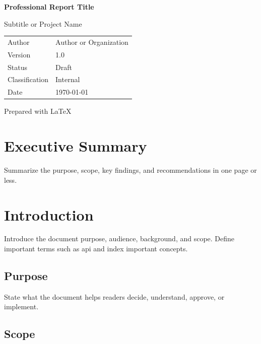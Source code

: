 \documentclass[11pt,a4paper,oneside]{scrreprt}
\newcommand{\DocumentTitle}{Professional Report Title}
\newcommand{\DocumentSubtitle}{Subtitle or Project Name}
\newcommand{\DocumentAuthor}{Author or Organization}
\newcommand{\DocumentVersion}{1.0}
\newcommand{\DocumentStatus}{Draft}
\newcommand{\DocumentDate}{\today}
\newcommand{\DocumentClassification}{Internal}
\begin{document}
\begin{titlepage}
  \centering
  \vspace*{18mm}
  {\sffamily\bfseries\LARGE \DocumentTitle\par}
  \vspace{4mm}
  {\sffamily\Large \DocumentSubtitle\par}
  \vfill
  \begin{tabular}{ll}
    Author & \DocumentAuthor \\
    Version & \DocumentVersion \\
    Status & \DocumentStatus \\
    Classification & \DocumentClassification \\
    Date & \DocumentDate \\
  \end{tabular}
  \vfill
  {\small Prepared with LaTeX}
\end{titlepage}


\chapter*{Executive Summary}
Summarize the purpose, scope, key findings, and recommendations in one page or less.

\tableofcontents
\listoffigures
\listoftables
\printglossary[type=\acronymtype,title={Acronyms}]
\printglossary

\clearpage
{}

\chapter{Introduction}
\label{chap:introduction}

Introduce the document purpose, audience, background, and scope. Define important terms such as \gls{api} and index important concepts.

\section{Purpose}
\label{sec:purpose}

State what the document helps readers decide, understand, approve, or implement.

\section{Scope}
\label{sec:scope}
\end{document}

